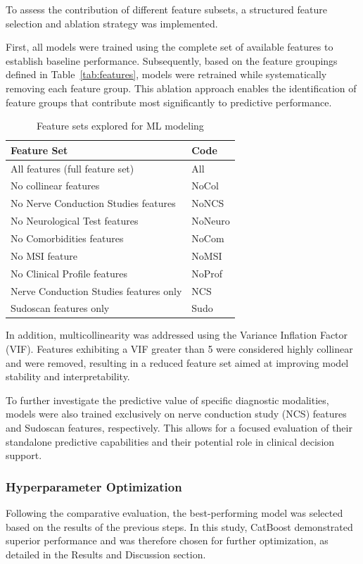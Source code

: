 \documentclass[fleqn,10pt]{wlscirep}
\begin{document}
To assess the contribution of different feature subsets, a structured feature selection and ablation strategy was implemented.

First, all models were trained using the complete set of available features to establish baseline performance. Subsequently, based on the feature groupings defined in Table~\ref{tab:features}, models were retrained while systematically removing each feature group. This ablation approach enables the identification of feature groups that contribute most significantly to predictive performance.

\begin{table}[h!]
\centering
\small
\begin{tabular}{ll}
\toprule
Feature Set & Code  \\
\midrule
All features (full feature set)&  All   \\
No collinear features  &  NoCol\\
No Nerve Conduction Studies features  & NoNCS \\
No Neurological Test features & NoNeuro \\
No Comorbidities features & NoCom \\
No MSI feature & NoMSI  \\
No Clinical Profile features  &  NoProf\\
Nerve Conduction Studies features  only & NCS \\
Sudoscan features only & Sudo \\
\bottomrule
\end{tabular}
\caption{Feature sets explored for ML modeling}
\label{tab:feature_sets}
\end{table}

In addition, multicollinearity was addressed using the Variance Inflation Factor (VIF). Features exhibiting a VIF greater than 5 were considered highly collinear and were removed, resulting in a reduced feature set aimed at improving model stability and interpretability.

To further investigate the predictive value of specific diagnostic modalities, models were also trained exclusively on nerve conduction study (NCS) features and Sudoscan features, respectively. This allows for a focused evaluation of their standalone predictive capabilities and their potential role in clinical decision support.

\subsubsection*{Hyperparameter Optimization}
Following the comparative evaluation, the best-performing model was selected based on the results of the previous steps. In this study, CatBoost demonstrated superior performance and was therefore chosen for further optimization, as detailed in the Results and Discussion section.
\end{document}
